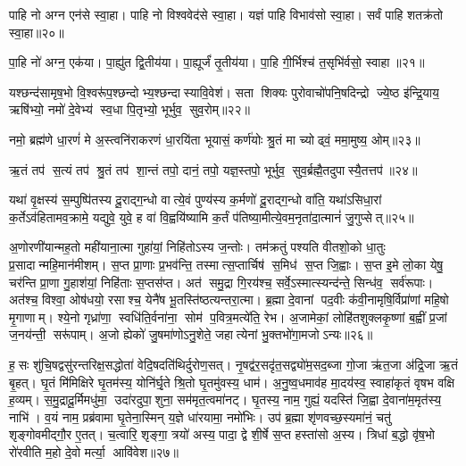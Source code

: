 पाहि नो अग्न एन॑से स्वा॒हा। पाहि नो विश्ववेद॑से स्वा॒हा। यज्ञं पाहि विभाव॑सो स्वा॒हा। सर्वं पाहि शतक्र॑तो स्वा॒हा॥२०॥
\anuvakamend

पा॒हि नो॑ अग्न॒ एक॑या। पा॒ह्यु॑त द्वि॒तीय॑या। पा॒ह्यूर्जं॑ तृ॒तीय॑या। पा॒हि गी॒र्भिश्च॑ त॒सृभि॑र्वसो॒ स्वाहा॥२१॥
\anuvakamend

यश्छन्द॑सामृष॒भो वि॒श्वरू॑प॒श्छन्दोभ्य॒श्छन्दास्यावि॒वेश॑। सता शिक्यः पुरोवाचो॑पनि॒षदिन्द्रो ज्ये॒ष्ठ इ॑न्द्रि॒याय॒ ऋषि॑भ्यो॒ नमो॑ दे॒वेभ्य॑ स्व॒धा पि॒तृभ्यो॒ भूर्भुव॒ सुव॒रोम्॥२२॥
\anuvakamend


नमो॒ ब्रह्म॑णे धा॒रणं॑ मे अ॒स्त्वनि॑राकरणं धा॒रयि॑ता भूयासं॒ कर्ण॑योः श्रु॒तं मा च्योढ्वं॒ ममा॒मुष्य॒ ओम्॥२३॥
\anuvakamend

ऋ॒तं तप॑ स॒त्यं तप॑ श्रु॒तं तप॑ शा॒न्तं तपो॒ दानं॒ तपो॒ यज्ञ॒स्तपो॒ भूर्भुव॒ सुव॒र्ब्रह्मै॒तदुपास्यै॒तत्तप॑॥२४॥
\anuvakamend


यथा॑ वृ॒क्षस्य॑ स॒म्पुष्पि॑तस्य दू॒राद्ग॒न्धो वात्ये॒वं पुण्य॑स्य क॒र्मणो॑ दू॒राद्ग॒न्धो वा॑ति॒ यथा॑ऽसिधा॒रां क॒र्तेऽव॑हितामव॒क्रामे॒ यद्युवे॒ युवे॒ ह वा॑ वि॒ह्वयि॑ष्यामि क॒र्तं प॑तिष्या॒मीत्ये॒वम॒नृता॑दा॒त्मानं॑ जु॒गुप्सेत्॥२५॥
\anuvakamend


अ॒णोरणी॑यान्मह॒तो मही॑याना॒त्मा गुहा॑यां॒ निहि॑तोऽस्य ज॒न्तोः। तम॑क्रतुं पश्यति वीतशो॒को धा॒तुः प्र॒सादान्महि॒मान॑\-मीशम्। स॒प्त प्रा॒णाः प्र॒भव॑न्ति॒ तस्मात्स॒प्तार्चिष॑ स॒मिध॑ स॒प्त जि॒ह्वाः। स॒प्त इ॒मे लो॒का येषु॒ चर॑न्ति प्रा॒णा गु॒हाश॑यां॒ निहि॑ताः स॒प्तस॑प्त। अत॑ समु॒द्रा गि॒रय॑श्च॒ सर्वे॒ऽस्मात्स्यन्द॑न्ते॒ सिन्ध॑व॒ सर्व॑रूपाः। अत॑श्च॒ विश्वा॒ ओष॑धयो॒ रसाश्च॒ येनै॑ष भू॒तस्ति॑ष्ठत्यन्तरा॒त्मा। ब्र॒ह्मा दे॒वानां पद॒वीः क॑वी॒नामृषि॒र्विप्रा॑णां महि॒षो मृ॒गाणाम्। श्ये॒नो गृध्रा॑णा॒ स्वधि॑ति॒र्वना॑ना॒ सोम॑ प॒वित्र॒मत्ये॑ति॒ रेभ\sn{}। अ॒जामेकां॒ लोहि॑तशुक्लकृ॒ष्णां ब॒ह्वीं प्र॒जां ज॒नय॑न्ती॒ सरू॑पाम्। अ॒जो ह्येको॑ जु॒षमा॑णोऽनु॒शेते॒ जहात्येनां भु॒क्तभो॑गा॒मजोऽन्यः॥२६॥

ह॒सः शु॑चि॒षद्वसु॑रन्तरिक्ष॒सद्धोता॑ वेदि॒षदति॑थिर्दुरोण॒सत्। नृ॒षद्व॑र॒सदृ॑त॒सद्व्यो॑म॒सद॒ब्जा गो॒जा ऋ॑त॒जा अ॑द्रि॒जा ऋ॒तं बृ॒हत्। घृ॒तं मि॑मिक्षिरे घृ॒तम॑स्य॒ योनि॑र्घृ॒ते श्रि॒तो घृ॒तमु॑वस्य॒ धाम॑। अ॒नु॒ष्व॒धमाव॑ह मा॒दय॑स्व॒ स्वाहा॑कृतं वृषभ वक्षि ह॒व्यम्। स॒मु॒द्रादू॒र्मिमधु॑मा॒ उदा॑रदुपा॒शुना॒ सम॑मृत॒त्वमा॑नट्। घृ॒तस्य॒ नाम॒ गुह्यं॒ यदस्ति॑ जि॒ह्वा दे॒वाना॑म॒मृत॑स्य॒ नाभि॑। व॒यं नाम॒ प्रब्र॑वामा घृ॒तेना॒स्मिन् य॒ज्ञे धा॑रयामा॒ नमो॑भिः। उप॑ ब्र॒ह्मा शृ॑णवच्छ॒स्यमा॑नं॒ चतु॑ शृङ्गोवमीद्गौ॒र ए॒तत्। च॒त्वारि॒ शृङ्गा॒ त्रयो॑ अस्य॒ पादा॒ द्वे शी॒र्\mbox{}षे स॒प्त हस्ता॑सो अ॒स्य। त्रिधा॑ ब॒द्धो वृ॑ष॒भो रो॑रवीति म॒हो दे॒वो मर्त्या॒ आवि॑वेश॥२७॥

